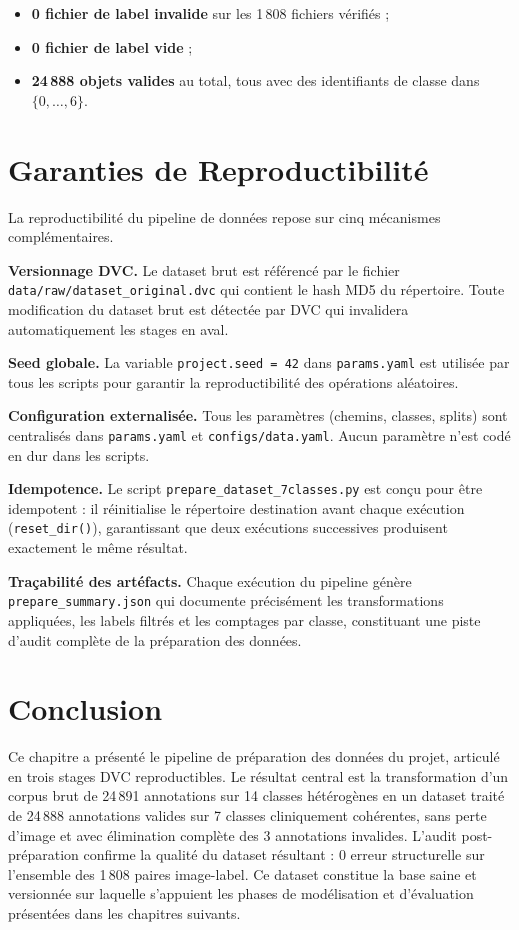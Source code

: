 \documentclass{rapportENSIAS}
\newcommand{\projectpath}[1]{\texttt{#1}}
\begin{document}
\begin{itemize}
    \item \textbf{0 fichier de label invalide} sur les 1\,808 fichiers vérifiés ;
    \item \textbf{0 fichier de label vide} ;
    \item \textbf{24\,888 objets valides} au total,
          tous avec des identifiants de classe dans $\{0, \ldots, 6\}$.
\end{itemize}

\section{Garanties de Reproductibilité}

La reproductibilité du pipeline de données repose sur cinq mécanismes complémentaires.

\textbf{Versionnage DVC.} Le dataset brut est référencé par le fichier
\projectpath{data/raw/dataset\_original.dvc} qui contient le hash MD5 du
répertoire. Toute modification du dataset brut est détectée par DVC qui
invalidera automatiquement les stages en aval.

\textbf{Seed globale.} La variable \texttt{project.seed = 42} dans
\projectpath{params.yaml} est utilisée par tous les scripts pour garantir
la reproductibilité des opérations aléatoires.

\textbf{Configuration externalisée.} Tous les paramètres (chemins, classes,
splits) sont centralisés dans \projectpath{params.yaml} et
\projectpath{configs/data.yaml}. Aucun paramètre n'est codé en dur dans
les scripts.

\textbf{Idempotence.} Le script \texttt{prepare\_dataset\_7classes.py} est
conçu pour être idempotent : il réinitialise le répertoire destination avant
chaque exécution (\texttt{reset\_dir()}), garantissant que deux exécutions
successives produisent exactement le même résultat.

\textbf{Traçabilité des artéfacts.} Chaque exécution du pipeline génère
\texttt{prepare\_summary.json} qui documente précisément les transformations
appliquées, les labels filtrés et les comptages par classe, constituant une
piste d'audit complète de la préparation des données.

\section{Conclusion}

Ce chapitre a présenté le pipeline de préparation des données du projet,
articulé en trois stages DVC reproductibles. Le résultat central est la
transformation d'un corpus brut de 24\,891 annotations sur 14 classes
hétérogènes en un dataset traité de 24\,888 annotations valides sur 7 classes
cliniquement cohérentes, sans perte d'image et avec élimination complète
des 3 annotations invalides. L'audit post-préparation confirme la qualité
du dataset résultant : 0 erreur structurelle sur l'ensemble des 1\,808 paires
image-label. Ce dataset constitue la base saine et versionnée sur laquelle
s'appuient les phases de modélisation et d'évaluation présentées dans les
chapitres suivants.
\end{document}
